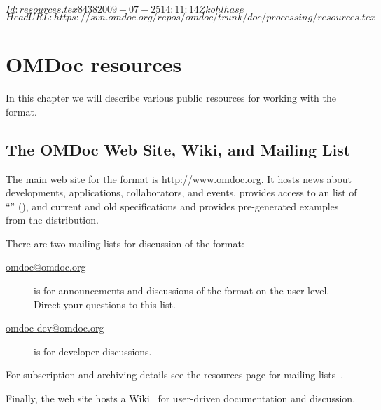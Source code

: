 \svnInfo $Id: resources.tex 8438 2009-07-25 14:11:14Z kohlhase $
\svnKeyword $HeadURL: https://svn.omdoc.org/repos/omdoc/trunk/doc/processing/resources.tex $

\chapter{OMDoc resources}\label{chap:resources}
In this chapter we will describe various public resources for working with the
{\omdoc} format.

\section{The OMDoc Web Site, Wiki, and Mailing List}\label{sec:website}  The main web site for the {\omdoc} format is \url{http://www.omdoc.org}.  It
  hosts news about developments, applications, collaborators, and events, provides access
  to an list of ``'' ({}), and
  current and old {\omdoc} specifications and provides pre-generated examples from the
  {\omdoc} distribution.
  
  There are two mailing lists for discussion of the {\omdoc} format: 
  \begin{description}
  \item[\url{omdoc@omdoc.org}] is for announcements and discussions of the {\omdoc}
    format on the user level. Direct your questions to this list.
  \item[\url{omdoc-dev@omdoc.org}] is for developer discussions.
  \end{description}
  For subscription and archiving details see the {\omdoc} resources page for mailing
  lists~\cite{OMDoc-mailinglists:URL}.
  
  Finally, the {\omdoc} web site hosts a Wiki~\cite{OMDoc:wiki} for user-driven
  documentation and discussion.


